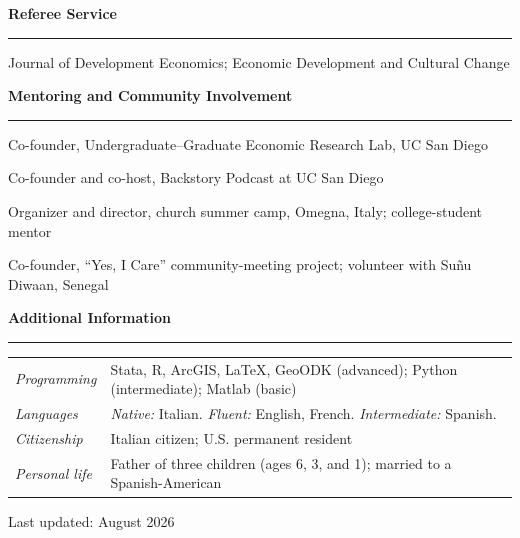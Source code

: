 \documentclass[10pt,letterpaper]{article}
\newcommand{\cvsection}[1]{%
  \Needspace{4\baselineskip}%
  \vspace{15pt}%
  {\large\bfseries #1}\par
  \vspace{4pt}\hrule\vspace{9pt}%
}
\newcommand{\communityentry}[1]{#1\par\vspace{7pt}}
\begin{document}
\cvsection{Referee Service}
Journal of Development Economics; Economic Development and Cultural Change

\newpage
\cvsection{Mentoring and Community Involvement}
\communityentry{Co-founder, Undergraduate--Graduate Economic Research Lab, UC San Diego}
\communityentry{Co-founder and co-host, Backstory Podcast at UC San Diego}
\communityentry{Organizer and director, church summer camp, Omegna, Italy; college-student mentor}
\communityentry{Co-founder, ``Yes, I Care'' community-meeting project; volunteer with Su\~nu Diwaan, Senegal}

\cvsection{Additional Information}
\begin{tabularx}{\textwidth}{@{}>{\itshape}p{}X@{}}
  Programming & Stata, R, ArcGIS, \LaTeX, GeoODK (advanced); Python (intermediate); Matlab (basic) \\
  Languages & \textit{Native:} Italian. \textit{Fluent:} English, French. \textit{Intermediate:} Spanish. \\
  Citizenship & Italian citizen; U.S. permanent resident \\
  Personal life & Father of three children (ages 6, 3, and 1); married to a Spanish-American
\end{tabularx}

\vfill
\begin{center}
  \footnotesize Last updated: August 2026
\end{center}
\end{document}
